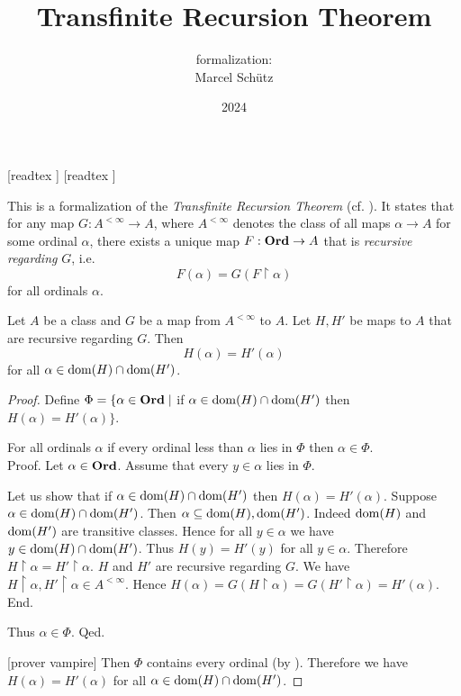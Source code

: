 \documentclass{article}
\title{Transfinite Recursion Theorem}
\author{\Naproche formalization: \vspace{0.5em} \\
Marcel Schütz}
\date{2024}
\begin{document}
  \maketitle

  \begin{imports}
    \begin{forthel}
      [readtex ]
      [readtex ]
    \end{forthel}
  \end{imports}
  
  \noindent This is a formalization of the \emph{Transfinite Recursion Theorem}
  (cf. \cite{Koepke2018}).
  It states that for any map $G : A^{< \infty} \to A$, where $A^{< \infty}$
  denotes the class of all maps $\alpha \to A$ for some ordinal $\alpha$, there
  exists a unique map $F: \textbf{Ord} \to A$ that is \emph{recursive regarding} $G$,
  i.e. \[F(\alpha) = G(F \restriction \alpha)\] for all ordinals $\alpha$.

  \begin{forthel}
    \begin{lemma*}\label{coincidence}
      Let $A$ be a class and $G$ be a map from $A^{< \infty}$ to $A$.
      Let $H, H'$ be maps to $A$ that are recursive regarding $G$.
      Then \[ H(\alpha) = H'(\alpha) \] for all $\alpha \in \operatorname{dom}(H) \cap \operatorname{dom}(H')$.
    \end{lemma*}
    \begin{proof}
      Define $\Phi = \{ \alpha \in \textbf{Ord} \mid$ if
      $\alpha \in \operatorname{dom}(H) \cap \operatorname{dom}(H')$ then $H(\alpha) = H'(\alpha) \}$.

      For all ordinals $\alpha$ if every ordinal less than $\alpha$ lies in $\Phi$ then $\alpha \in \Phi$. \\
      Proof.
        Let $\alpha \in \textbf{Ord}$.
        Assume that every $y \in \alpha$ lies in $\Phi$.

        Let us show that if $\alpha \in \operatorname{dom}(H) \cap \operatorname{dom}(H')$ then
        $H(\alpha) = H'(\alpha)$.
          Suppose $\alpha \in \operatorname{dom}(H) \cap \operatorname{dom}(H')$.
          Then $\alpha \subseteq \operatorname{dom}(H), \operatorname{dom}(H')$.
          Indeed $\operatorname{dom}(H)$ and $\operatorname{dom}(H')$ are transitive classes.
          Hence for all $y \in \alpha$ we have $y \in \operatorname{dom}(H) \cap \operatorname{dom}(H')$.
          Thus $H(y) = H'(y)$ for all $y \in \alpha$.
          Therefore $H \restriction \alpha = H' \restriction \alpha$.
          $H$ and $H'$ are recursive regarding $G$.
          We have $H \restriction \alpha, H' \restriction \alpha \in A^{< \infty}$.
          Hence $H(\alpha)
            = G(H \restriction \alpha)
            = G(H' \restriction \alpha)
            = H'(\alpha)$.
        End.

        Thus $\alpha \in \Phi$.
      Qed.

      [prover vampire]
      Then $\Phi$ contains every ordinal (by ).
      Therefore we have $H(\alpha) = H'(\alpha)$ for all $\alpha \in \operatorname{dom}(H) \cap \operatorname{dom}(H')$.
    \end{proof}
  \end{forthel}
\end{document}
